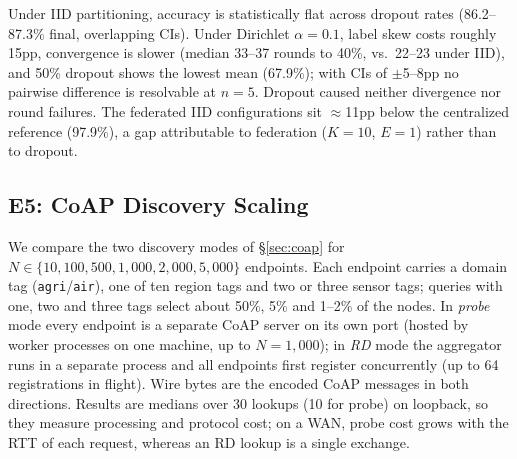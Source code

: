Under IID partitioning, accuracy is statistically flat across dropout rates (86.2--87.3\% final, overlapping CIs). Under Dirichlet $\alpha{=}0.1$, label skew costs roughly 15pp, convergence is slower (median 33--37 rounds to 40\%, vs.\ 22--23 under IID), and 50\% dropout shows the lowest mean (67.9\%); with CIs of $\pm$5--8pp no pairwise difference is resolvable at $n{=}5$. Dropout caused neither divergence nor round failures. The federated IID configurations sit $\approx$11pp below the centralized reference (97.9\%), a gap attributable to federation ($K{=}10$, $E{=}1$) rather than to dropout.

\subsection{E5: CoAP Discovery Scaling}
\label{sec:e5}

We compare the two discovery modes of \S\ref{sec:coap} for $N \in \{10, 100, 500, 1{,}000, 2{,}000, 5{,}000\}$ endpoints. Each endpoint carries a domain tag (\texttt{agri}/\texttt{air}), one of ten region tags and two or three sensor tags; queries with one, two and three tags select about 50\%, 5\% and 1--2\% of the nodes. In \emph{probe} mode every endpoint is a separate CoAP server on its own port (hosted by worker processes on one machine, up to $N{=}1{,}000$); in \emph{RD} mode the aggregator runs in a separate process and all endpoints first register concurrently (up to 64 registrations in flight). Wire bytes are the encoded CoAP messages in both directions. Results are medians over 30 lookups (10 for probe) on loopback, so they measure processing and protocol cost; on a WAN, probe cost grows with the RTT of each request, whereas an RD lookup is a single exchange.

